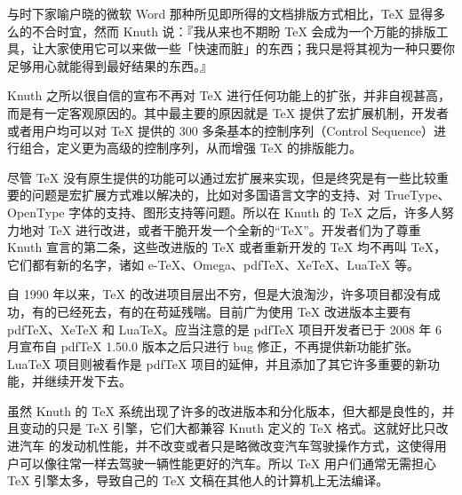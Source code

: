 \documentclass[../../../dolphin-book-2023.tex]{subfiles}
\begin{document}
与时下家喻户晓的微软 Word 那种所见即所得的文档排版方式相比，TeX 显得多么的不合时宜，然而 Knuth 说：『我从来也不期盼 TeX 会成为一个万能的排版工具，让大家使用它可以来做一些「快速而脏」的东西；我只是将其视为一种只要你足够用心就能得到最好结果的东西。』

Knuth 之所以很自信的宣布不再对 TeX 进行任何功能上的扩张，并非自视甚高，而是有一定客观原因的。其中最主要的原因就是 TeX 提供了宏扩展机制，开发者或者用户均可以对 TeX 提供的 300 多条基本的控制序列（Control Sequence）进行组合，定义更为高级的控制序列，从而增强 TeX 的排版能力。

尽管 TeX 没有原生提供的功能可以通过宏扩展来实现，但是终究是有一些比较重要的问题是宏扩展方式难以解决的，比如对多国语言文字的支持、对 TrueType、OpenType 字体的支持、图形支持等问题。所以在 Knuth 的 TeX 之后，许多人努力地对 TeX 进行改进，或者干脆开发一个全新的“TeX”。开发者们为了尊重 Knuth 宣言的第二条，这些改进版的 TeX 或者重新开发的 TeX 均不再叫 TeX，它们都有新的名字，诸如 e-TeX、Omega、pdfTeX、XeTeX、LuaTeX 等。

自 1990 年以来，TeX 的改进项目层出不穷，但是大浪淘沙，许多项目都没有成功，有的已经死去，有的在苟延残喘。目前广为使用 TeX 改进版本主要有 pdfTeX、XeTeX 和 LuaTeX。应当注意的是 pdfTeX 项目开发者已于 2008 年 6 月宣布自 pdfTeX 1.50.0 版本之后只进行 bug 修正，不再提供新功能扩张。LuaTeX 项目则被看作是 pdfTeX 项目的延伸，并且添加了其它许多重要的新功能，并继续开发下去。

虽然 Knuth 的 TeX 系统出现了许多的改进版本和分化版本，但大都是良性的，并且变动的只是 TeX 引擎，它们大都兼容 Knuth 定义的 TeX 格式。这就好比只改进汽车 的发动机性能，并不改变或者只是略微改变汽车驾驶操作方式，这使得用户可以像往常一样去驾驶一辆性能更好的汽车。所以 TeX 用户们通常无需担心 TeX 引擎太多，导致自己的 TeX 文稿在其他人的计算机上无法编译。
\end{document}
